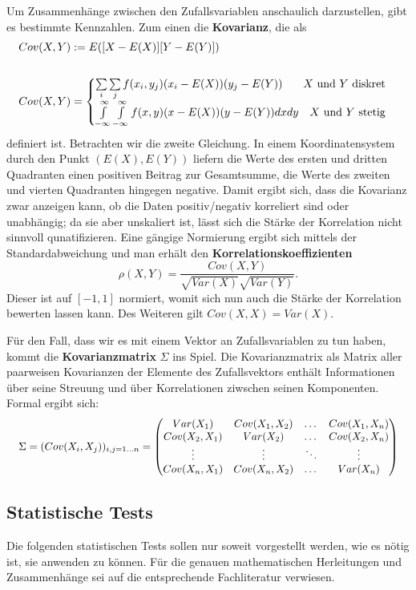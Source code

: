 Um Zusammenhänge zwischen den Zufallsvariablen anschaulich darzustellen, gibt es bestimmte Kennzahlen. Zum einen die \textbf{Kovarianz}, die als
\begin{align*}
	Cov(X,Y) &:= E([X-E(X)][Y-E(Y)])\\
	\\
	Cov(X,Y) &= 
		\begin{cases}
		\sum\limits_i \sum\limits_j f(x_i,y_j)(x_i-E(X))(y_j-E(Y)) \hfill X \text{ und } Y \text{ diskret}\\
		\int\limits_{-\infty}^{\infty} \int\limits_{-\infty}^{\infty} f(x,y)(x-E(X))(y-E(Y))dxdy\quad X \text{ und } Y \text{ stetig}\\
		\end{cases}
\end{align*}
definiert ist. Betrachten wir die zweite Gleichung. In einem Koordinatensystem durch den Punkt \((E(X),E(Y))\) liefern die Werte des ersten und dritten Quadranten einen positiven Beitrag zur Gesamtsumme, die Werte des zweiten und vierten Quadranten hingegen negative. Damit ergibt sich, dass die Kovarianz zwar anzeigen kann, ob die Daten positiv/negativ korreliert sind oder unabhängig; da sie aber unskaliert ist, lässt sich die Stärke der Korrelation nicht sinnvoll qunatifizieren.
Eine gängige Normierung ergibt sich mittels der Standardabweichung und man erhält den \textbf{Korrelationskoeffizienten} 
\[
	\rho(X,Y) = \frac{Cov(X,Y)}{\sqrt{Var(X)} \sqrt{Var(Y)}}.
\] 
Dieser ist auf \([-1,1]\) normiert, womit sich nun auch die Stärke der Korrelation bewerten lassen kann. Des Weiteren gilt \(Cov(X,X)=Var(X)\).

Für den Fall, dass wir es mit einem Vektor an Zufallsvariablen zu tun haben, kommt die \textbf{Kovarianzmatrix} \(\Sigma\) ins Spiel. Die Kovarianzmatrix als Matrix aller paarweisen Kovarianzen der Elemente des Zufallsvektors enthält Informationen über seine Streuung und über Korrelationen ziwschen seinen Komponenten.
Formal ergibt sich:
\[
	\resizebox{\textwidth}{!}{
		\(\Sigma = (Cov(X_i,X_j))_{i,j = 1\dots n} = 
		\begin{pmatrix}
			Var(X_1) & Cov(X_1,X_2) &\dots & Cov(X_1,X_n)\\
			Cov(X_2,X_1)& Var(X_2) &\dots & Cov(X_2,X_n)\\
			\vdots &\vdots &\ddots &\vdots\\
			Cov(X_n,X_1) & Cov(X_n,X_2) &\dots &Var(X_n)
		\end{pmatrix}\)
	}
\] 

\subsection{Statistische Tests}
Die folgenden statistischen Tests sollen nur soweit vorgestellt werden, wie es nötig ist, sie anwenden zu können.
Für die genauen mathematischen Herleitungen und Zusammenhänge sei auf die entsprechende Fachliteratur verwiesen.

